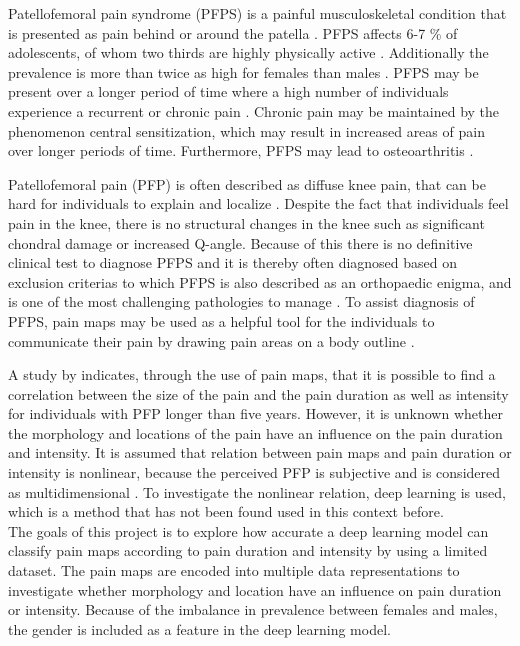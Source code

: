 Patellofemoral pain syndrome (PFPS) is a painful musculoskeletal condition that is presented as pain behind or around the patella \citep{Maclachlan2017, Smith2015}. PFPS affects 6-7 \% of adolescents, of whom two thirds are highly physically active \citep{Rathleff2015}. Additionally the prevalence is more than twice as high for females than males \citep{Rathleff2015, Petersen2013}.
PFPS may be present over a longer period of time where a high number of individuals experience a recurrent or chronic pain \citep{Witvrouw2014}. Chronic pain may be maintained by the phenomenon central sensitization, which may result in increased areas of pain over longer periods of time. Furthermore, PFPS may lead to osteoarthritis \citep{Petersen2013, Crossley2016}. 

\noindent
Patellofemoral pain (PFP) is often described as diffuse knee pain, that can be hard for individuals to explain and localize \citep{Witvrouw2014}. Despite the fact that individuals feel pain in the knee, there is no structural changes in the knee such as significant chondral damage or increased Q-angle. Because of this there is no definitive clinical test to diagnose PFPS and it is thereby often diagnosed based on exclusion criterias \citep{Petersen2013} to which PFPS is also described as an orthopaedic enigma, and is one of the most challenging pathologies to manage \citep{Dye2001}.
To assist diagnosis of PFPS, pain maps may be used as a helpful tool for the individuals to communicate their pain by drawing pain areas on a body outline \citep{Boudreau2016}.

\noindent
A study by \citeauthor{Boudreau2017} indicates, through the use of pain maps, that it is possible to find a correlation between the size of the pain and the pain duration as well as intensity for individuals with PFP longer than five years.\citep{Boudreau2017} However, it is unknown whether the morphology and locations of the pain have an influence on the pain duration and intensity.
It is assumed that relation between pain maps and pain duration or intensity is nonlinear, because the perceived PFP is subjective and is considered as multidimensional \citep{Dansie2013}. To investigate the nonlinear relation, deep learning is used, which is a method that has not been found used in this context before. \\

\noindent
The goals of this project is to explore how accurate a deep learning model can classify pain maps according to pain duration and intensity by using a limited dataset. The pain maps are encoded into multiple data representations to investigate whether morphology and location have an influence on pain duration or intensity. Because of the imbalance in prevalence between females and males, the gender is included as a feature in the deep learning model. \newline

